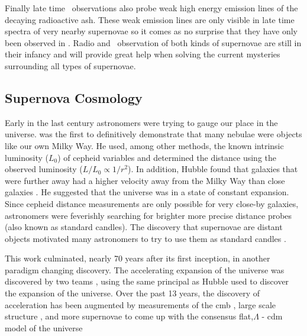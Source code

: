 Finally late time \xray\ observations also probe weak high energy emission lines of the decaying radioactive ash. These weak emission lines are only visible in late time spectra of very nearby supernovae so it comes as no surprise that they have only been observed in  \citep{1987Natur.330..230S, 1987Natur.330..230D}. Radio and \xray\ observation of both kinds of supernovae are still in their infancy and will provide great help when solving the current mysteries surrounding all types of supernovae.

\subsection{Supernova Cosmology}
\label{sec:intro:sncosmology}
Early in the last century astronomers were trying to gauge our place in the universe. \citet{1926ApJ....64..321H} was the first to definitively demonstrate that many nebulae were objects like our own Milky Way. He used, among other methods, the known intrinsic luminosity ($L_0$) of \gls{cepheid} variables and determined the distance using the observed luminosity ($L/L_0 \propto 1/r^2$).  In addition, Hubble found that galaxies that were further away had a higher velocity away from the Milky Way than close galaxies \citep{1929PNAS...15..168H}. He suggested that the universe was in a state of constant expansion. Since \gls{cepheid} distance measurements are only possible for very close-by galaxies, astronomers were feverishly searching for brighter more precise distance probes (also known as standard candles). The discovery that supernovae are distant objects \citet{1934PNAS...20..254B} motivated many astronomers to try to use them as standard candles \citep{1938ApJ....88..285B, 1960ZA.....49..201V, 1968AJ.....73.1021K,1990A&A...230...81L, 1990AJ....100..530M}. 

This work culminated, nearly 70 years after its first inception, in another paradigm changing discovery. The accelerating expansion of the universe was discovered by two teams \citep{1998AJ....116.1009R, 1999ApJ...517..565P}, using the same principal as Hubble used to discover the expansion of the universe. Over the past 13 years, the discovery of acceleration has been augmented by measurements of the \gls{cmb} \cite[e.g. WMAP7;][]{2011ApJS..192...18K}, large scale structure \citep[e.g.][]{2011MNRAS.tmp..951B}, and more supernovae \citep[e.g.]{2011A&A...525A...7A} to come up with the consensus flat,$\Lambda$ - \gls{cdm} model of the universe \citep[e.g.][]{2011arXiv1104.1444S}


